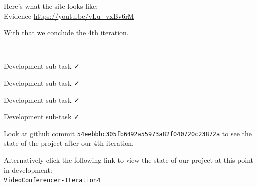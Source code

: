 Here's what the site looks like: \\ \vspace{0.2cm}
{\sffamily Evidence}  \url{https://youtu.be/vLu_vxBv6rM} \\ \vspace{0.2cm}

With that we conclude the 4th iteration. \\ \vspace{0.2cm}

{\color{gray} \hrulefill} \\ \vspace{0.2cm}

{\sffamily Development sub-task } \faCheck \\ \vspace{0.2cm}

{\sffamily Development sub-task } \faCheck \\ \vspace{0.2cm}

{\sffamily Development sub-task } \faCheck \\ \vspace{0.2cm}

{\sffamily Development sub-task } \faCheck \\ \vspace{0.2cm}

Look at github commit \texttt{54eebbbc305fb6092a55973a82f040720c23872a} to see the state
of the project after our 4th iteration. \\ \vspace{0.2cm}

Alternatively click the following link to view the state of our project at this point in
development: \\
\href{https://github.com/zzzNathan/Video-Conferencer/tree/54eebbbc305fb6092a55973a82f040720c23872a}{\texttt{VideoConferencer-Iteration4}}
